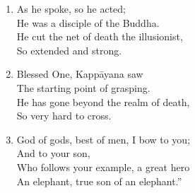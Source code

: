 \documentclass[10pt, openany]{book}
\begin{document}
\begin{enumerate}
\item As he spoke, so he acted;\\
He was a disciple of the Buddha.\\
He cut the net of death the illusionist,\\
So extended and strong.

\item Blessed One, Kappāyana saw\\
The starting point of grasping.\\
He has gone beyond the realm of death,\\
So very hard to cross.

\item God of gods, best of men, I bow to you;\\
And to your son,\\
Who follows your example, a great hero\\
An elephant, true son of an elephant.”

\end{enumerate}
\end{document}
